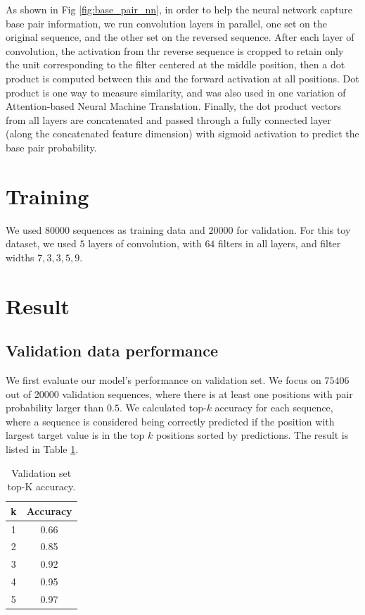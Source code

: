 \documentclass{proposal}
\begin{document}
As shown in Fig \ref{fig:base_pair_nn}, in order to help the neural network capture base pair information,
we run convolution layers in parallel, one set on the original sequence, and the other set on the reversed sequence.
After each layer of convolution, the activation from thr reverse sequence is
cropped to retain only the unit corresponding to the filter centered at the middle position,
then a dot product is computed between this and the forward activation at all positions.
Dot product is one way to measure similarity, and was also used in one variation of Attention-based Neural Machine Translation\cite{luong2015effective}.
Finally, the dot product vectors from all layers are concatenated and passed
through a fully connected layer (along the concatenated feature dimension) with sigmoid activation to predict the base pair probability.

\section{Training}

We used $80000$ sequences as training data and $20000$ for validation.
For this toy dataset, we used $5$ layers of convolution, with $64$ filters in all layers,
and filter widths $7, 3, 3, 5, 9$.


\section{Result}

\subsection{Validation data performance}

We first evaluate our model's performance on validation set.
We focus on $75406$ out of $20000$ validation sequences, where there
is at least one positions with pair probability larger than $0.5$.
We calculated top-$k$ accuracy for each sequence,
where a sequence is considered being correctly predicted if the
position with largest target value is in the top $k$ positions sorted by predictions.
The result is listed in Table \ref{table:base_pair_validation_performance}.

\begin{table}[h!]
    \centering
    \begin{tabular}{||c c||}
        \hline
        k & Accuracy \\ [0.5ex]
        \hline\hline
        1 & 0.66 \\
        \hline
        2 & 0.85 \\
        \hline
        3 & 0.92 \\
        \hline
        4 & 0.95 \\
        \hline
        5 & 0.97 \\
        \hline
    \end{tabular}
    \caption{Validation set top-K accuracy.}
    \label{table:base_pair_validation_performance}
\end{table}
\end{document}
